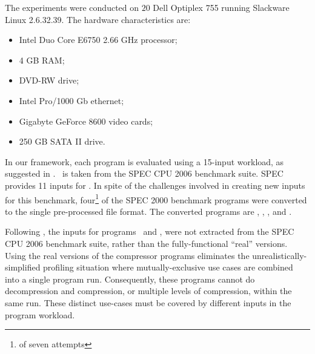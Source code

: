
The experiments were conducted on $20$ Dell Optiplex 755 running Slackware Linux 2.6.32.39. The hardware characteristics are:
\begin{itemize}

\item Intel Duo Core E6750 2.66 GHz processor;

\item 4 GB RAM;

\item DVD-RW drive;

\item Intel Pro/1000 Gb ethernet;

\item Gigabyte GeForce 8600 video cards;

\item 250 GB SATA II drive. 

\end{itemize}

In our framework, each program is evaluated using a 15-input workload, as suggested in \cite{BerubePhD}. \Gcc\ is taken from the SPEC CPU 2006 benchmark suite.  SPEC provides 11 inputs for \gcc. In spite of the challenges involved in creating new inputs for this benchmark, four\footnote{of seven attempts} of the SPEC 2000 benchmark programs were converted to the single pre-processed file format. The converted programs are \bzip, \lbm, \mcf, and \parser.

Following \cite{BerubePhD}, the inputs for programs \bzip\ and \gzip, were not extracted from the SPEC CPU 2006 benchmark suite, rather than the fully-functional ``real'' versions. Using the real versions of the compressor programs eliminates the unrealistically-simplified profiling situation where mutually-exclusive use cases are combined into a single program run. Consequently, these programs cannot do decompression and compression, or multiple levels of compression, within the same run.  These distinct use-cases must be covered by different inputs in the program workload.

